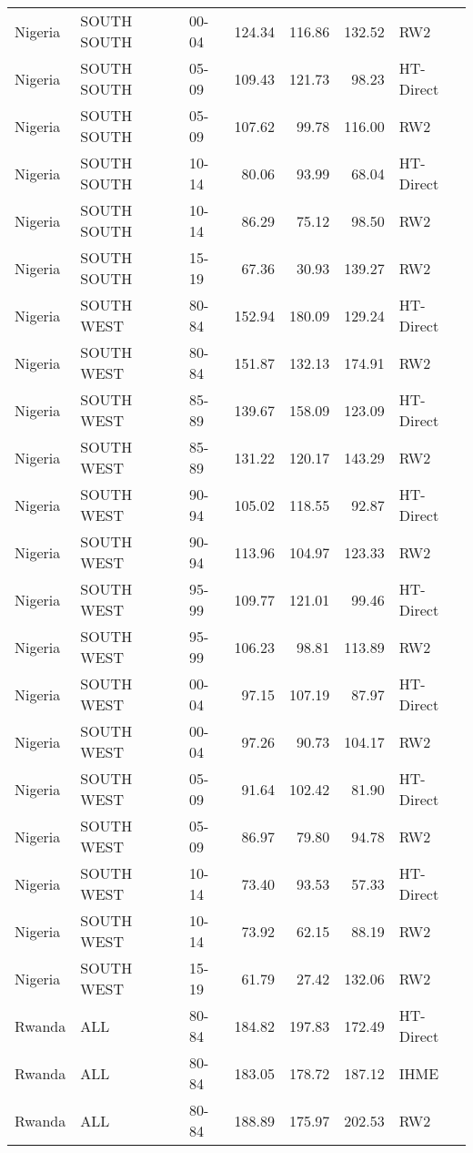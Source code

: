 \begin{longtable}{lllrrrl}
  Nigeria & SOUTH SOUTH & 00-04 & 124.34 & 116.86 & 132.52 & RW2 \\ 
  Nigeria & SOUTH SOUTH & 05-09 & 109.43 & 121.73 & 98.23 & HT-Direct \\ 
  Nigeria & SOUTH SOUTH & 05-09 & 107.62 & 99.78 & 116.00 & RW2 \\ 
  Nigeria & SOUTH SOUTH & 10-14 & 80.06 & 93.99 & 68.04 & HT-Direct \\ 
  Nigeria & SOUTH SOUTH & 10-14 & 86.29 & 75.12 & 98.50 & RW2 \\ 
  Nigeria & SOUTH SOUTH & 15-19 & 67.36 & 30.93 & 139.27 & RW2 \\ 
  Nigeria & SOUTH WEST & 80-84 & 152.94 & 180.09 & 129.24 & HT-Direct \\ 
  Nigeria & SOUTH WEST & 80-84 & 151.87 & 132.13 & 174.91 & RW2 \\ 
  Nigeria & SOUTH WEST & 85-89 & 139.67 & 158.09 & 123.09 & HT-Direct \\ 
  Nigeria & SOUTH WEST & 85-89 & 131.22 & 120.17 & 143.29 & RW2 \\ 
  Nigeria & SOUTH WEST & 90-94 & 105.02 & 118.55 & 92.87 & HT-Direct \\ 
  Nigeria & SOUTH WEST & 90-94 & 113.96 & 104.97 & 123.33 & RW2 \\ 
  Nigeria & SOUTH WEST & 95-99 & 109.77 & 121.01 & 99.46 & HT-Direct \\ 
  Nigeria & SOUTH WEST & 95-99 & 106.23 & 98.81 & 113.89 & RW2 \\ 
  Nigeria & SOUTH WEST & 00-04 & 97.15 & 107.19 & 87.97 & HT-Direct \\ 
  Nigeria & SOUTH WEST & 00-04 & 97.26 & 90.73 & 104.17 & RW2 \\ 
  Nigeria & SOUTH WEST & 05-09 & 91.64 & 102.42 & 81.90 & HT-Direct \\ 
  Nigeria & SOUTH WEST & 05-09 & 86.97 & 79.80 & 94.78 & RW2 \\ 
  Nigeria & SOUTH WEST & 10-14 & 73.40 & 93.53 & 57.33 & HT-Direct \\ 
  Nigeria & SOUTH WEST & 10-14 & 73.92 & 62.15 & 88.19 & RW2 \\ 
  Nigeria & SOUTH WEST & 15-19 & 61.79 & 27.42 & 132.06 & RW2 \\ 
  Rwanda & ALL & 80-84 & 184.82 & 197.83 & 172.49 & HT-Direct \\ 
  Rwanda & ALL & 80-84 & 183.05 & 178.72 & 187.12 & IHME \\ 
  Rwanda & ALL & 80-84 & 188.89 & 175.97 & 202.53 & RW2 \\ 

\end{longtable}
